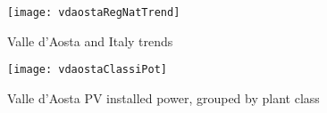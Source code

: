 \documentclass[12pt,a4paper,openright,twoside]{report}
\begin{document}
\begin{figure}[hp]
	\centering
	\texttt{[image: vdaostaRegNatTrend]}
	\caption{Valle d'Aosta and Italy trends}
	\label{vdaostaRegNatTrend}
\end{figure}

\begin{figure}[hp]
	\centering
	\texttt{[image: vdaostaClassiPot]}
	\caption{Valle d'Aosta PV installed power, grouped by plant class}
	\label{vdaostaClassiPot}
\end{figure}
\end{document}
